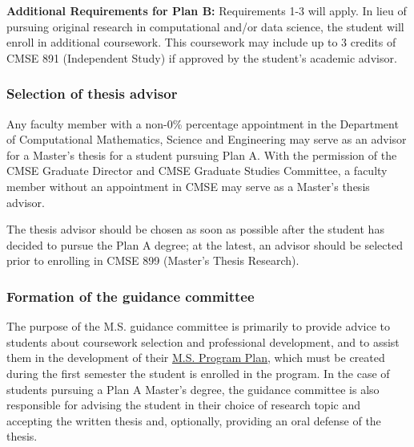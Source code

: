 \vspace{3mm}
\noindent
\textbf{Additional Requirements for Plan B:} Requirements 1-3 will
apply. In lieu of pursuing original research in computational and/or
data science, the student will enroll in additional coursework. This
coursework may include up to 3 credits of CMSE 891 (Independent Study)
if approved by the student's academic advisor. 


\subsubsection{Selection of thesis advisor}

Any faculty member with a non-0\% percentage appointment in the
Department of Computational Mathematics, Science and Engineering may
serve as an advisor for a Master's thesis for a student pursuing Plan
A.  With the permission of the CMSE Graduate Director and CMSE
Graduate Studies Committee, a faculty member without an appointment in
CMSE may serve as a Master's thesis advisor.  

The thesis advisor should be
chosen as soon as possible after the student has decided to pursue the
Plan A degree; at the latest, an advisor should be selected prior to
enrolling in CMSE 899 (Master's Thesis Research).  


\subsubsection{Formation of the guidance committee}
\label{sec:ms_guidance_comm}

The purpose of the M.S. guidance committee is primarily to provide
advice to students about coursework selection and professional
development, and to assist them in the development of their
\href{https://www.egr.msu.edu/grs/}{M.S. Program Plan}, which must be
created during the first semester the student is enrolled in the
program.  In the case of students pursuing a Plan A Master's degree,
the guidance committee is also responsible for advising the student in
their choice of research topic and accepting the written thesis and,
optionally, providing an oral defense of the thesis.

